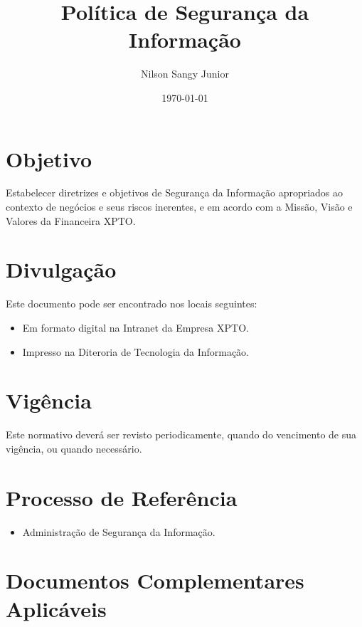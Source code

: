 \documentclass[a4paper,12pt]{article}
\title{\textbf{Política de Segurança da Informação}}
\author{Nilson Sangy Junior} %
\date{\today}
\begin{document}
\maketitle

\tableofcontents
\newpage

\section{Objetivo}

Estabelecer diretrizes e objetivos de Segurança da Informação apropriados ao contexto de negócios e seus riscos inerentes, e em acordo com a Missão, Visão e Valores da Financeira XPTO.

\section{Divulgação}

Este documento pode ser encontrado nos locais seguintes:

\begin{itemize}
    \item Em formato digital na Intranet da Empresa XPTO.
    \item Impresso na Diteroria de Tecnologia da Informação.
\end{itemize}

\section{Vigência}

Este normativo deverá ser revisto periodicamente, quando do vencimento de sua vigência, ou quando necessário.

\section{Processo de Referência}

\begin{itemize}
    \item Administração de Segurança da Informação.
\end{itemize}

\section{Documentos Complementares Aplicáveis}
\end{document}
